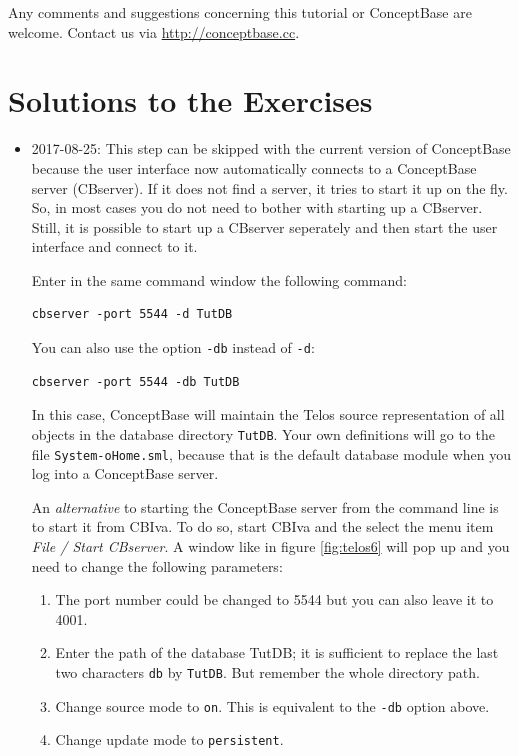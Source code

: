 \documentclass[10pt,a4paper]{article}
\begin{document}
Any comments and suggestions concerning this tutorial or ConceptBase
are welcome. Contact us via 
\url{http://conceptbase.cc}.



\newpage
\section{Solutions to the Exercises}

\begin{itemize}

\item 	[2.1]

{\scriptsize
2017-08-25: This step can be skipped with the current version of ConceptBase because
the user interface now automatically connects to a ConceptBase server (CBserver).
If it does not find a server, it tries to start it up on the fly.
So, in most cases you do not need to bother with starting up a CBserver.
Still, it is possible to start up a CBserver seperately and then start the
user interface and connect to it. 
}


Enter in the same command window the following command:
\begin{verbatim}
cbserver -port 5544 -d TutDB
\end{verbatim}

You can also use the option {\tt -db} instead of {\tt -d}:

\begin{verbatim}
cbserver -port 5544 -db TutDB
\end{verbatim}

In this case, ConceptBase will maintain the Telos source representation
of all objects in the database directory {\tt TutDB}. Your own definitions
will go to the file {\tt System-oHome.sml}, because that is the default
database module when you log into a ConceptBase server.

\vspace{0.2cm}
An {\em alternative} to starting the ConceptBase server from the command line is
to start it from CBIva. To do so, start CBIva and the select the menu item
{\em File / Start CBserver}. A window like in figure \ref{fig:telos6} will pop up and
you need to change the following parameters:

\begin{enumerate}
\item The port number could be changed to 5544 but you can also leave it to 4001.
\item Enter the path of the database TutDB; it is sufficient to replace the last two characters
  {\tt db} by {\tt TutDB}. But remember the whole directory path.
\item Change source mode to {\tt on}. This is equivalent to the {\tt -db} option above.
\item Change update mode to {\tt persistent}.
\end{enumerate}


\end{itemize}
\end{document}
